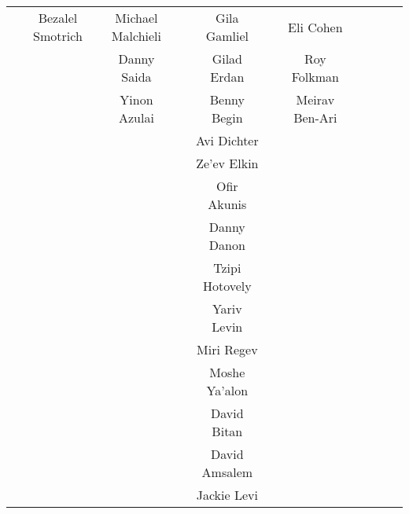\begin{landscape}
\begin{table}
\begin{tabular}{|c|c|c|c|c|c|c|c|c|c|c|}
                            & Bezalel Smotrich  & Michael Malchieli &                      & Gila Gamliel       &                   & Eli Cohen          \\
                            &                   & Danny Saida       &                      & Gilad Erdan        &                   & Roy Folkman        \\
                            &                   & Yinon Azulai      &                      & Benny Begin        &                   & Meirav Ben-Ari     \\
                            &                   &                   &                      & Avi Dichter        &                   &                    \\
                            &                   &                   &                      & Ze'ev Elkin        &                   &                    \\
                            &                   &                   &                      & Ofir Akunis        &                   &                    \\
                            &                   &                   &                      & Danny Danon        &                   &                    \\
                            &                   &                   &                      & Tzipi Hotovely     &                   &                    \\
                            &                   &                   &                      & Yariv Levin        &                   &                    \\
                            &                   &                   &                      & Miri Regev         &                   &                    \\
                            &                   &                   &                      & Moshe Ya'alon      &                   &                    \\
                            &                   &                   &                      & David Bitan        &                   &                    \\
                            &                   &                   &                      & David Amsalem      &                   &                    \\
                            &                   &                   &                      & Jackie Levi        &                   &                    \\

\end{tabular}
\end{table}
\end{landscape}
